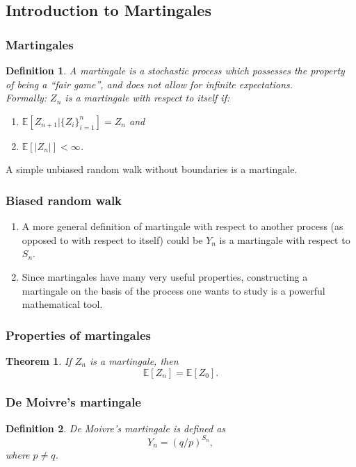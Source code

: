 \documentclass{article}
\newtheorem{theorem}{Theorem}
\newtheorem{definition}{Definition}
\newcommand{\E}{\mathbb{E}}
\begin{document}
\subsection{Introduction to Martingales}
\subsubsection{Martingales}
\begin{definition}
    A martingale is a stochastic process which possesses the property of being a ``fair game'', and does not allow for infinite expectations.\\
    Formally: $Z_n$ is a martingale with respect to itself if:
    \begin{enumerate}
        \item $\E[Z_{n+1}\vert \{ Z_i \}_{i=1}^n] = Z_n$ and
        \item $\E[\vert Z_n\vert]<\infty$.
    \end{enumerate}
\end{definition}
A simple unbiased random walk without boundaries is a martingale.

\subsubsection{Biased random walk}
\begin{enumerate}
    \item A more general definition of martingale with respect to another process (as opposed to with respect to itself) could be $Y_n$ is a martingale with respect to $S_n$.
    \item Since martingales have many very useful properties, constructing a martingale on the basis of the process one wants to study is a powerful mathematical tool.
\end{enumerate}

\subsubsection{Properties of martingales}
\begin{theorem}
    If $Z_n$ is a martingale, then
    \begin{equation}
        \E[Z_n] = \E[Z_0].
    \end{equation}
\end{theorem}

\subsubsection{De Moivre's martingale}
\begin{definition}
    De Moivre's martingale is defined as
    \begin{equation}
        Y_n = (q/p)^{S_n},
    \end{equation}
    where $p\neq q$.
\end{definition}
\end{document}

